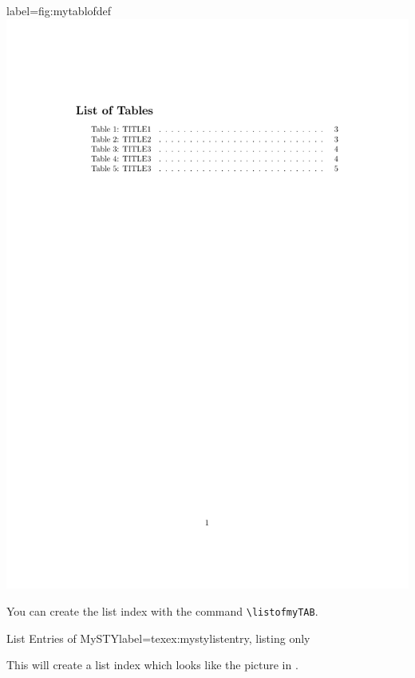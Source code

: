 \documentclass[]{myHOWTO-V001}
\begin{document}
\begin{minipage}{0.46\linewidth}
\centering
\begin{myFIGlst}{}{label={fig:mytablofdef}}
	\includegraphics[page=1,scale=0.18]{examples/myTABV000.pdf}
\end{myFIGlst}
\end{minipage}
\begin{minipage}{0.46\linewidth}
You can create the list index with the command \Verb|\listofmyTAB|.

\begin{myTEXEXdoclst}{List Entries of MySTY}{label={texex:mystylistentry}, listing only}
\listofmyTAB
\end{myTEXEXdoclst}

This will create a list index which looks like the picture in . 
\end{minipage}
\end{document}
